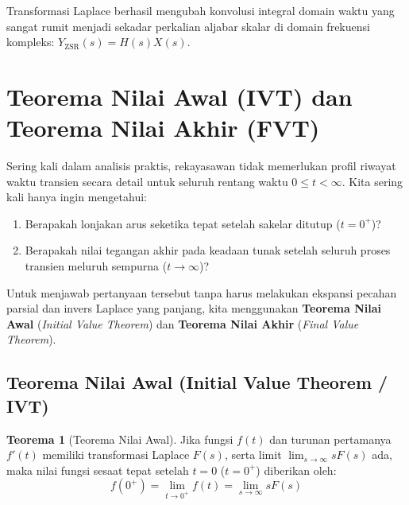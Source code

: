 \documentclass[11pt,a4paper]{article}
\theoremstyle{definition}
\newtheorem{theorem}{Teorema}[section]
\begin{document}
Transformasi Laplace berhasil mengubah konvolusi integral domain waktu yang sangat rumit menjadi sekadar perkalian aljabar skalar di domain frekuensi kompleks: $Y_{\text{ZSR}}(s) = H(s) X(s)$.

\section{Teorema Nilai Awal (IVT) dan Teorema Nilai Akhir (FVT)}

Sering kali dalam analisis praktis, rekayasawan tidak memerlukan profil riwayat waktu transien secara detail untuk seluruh rentang waktu $0 \le t < \infty$. Kita sering kali hanya ingin mengetahui:
\begin{enumerate}[leftmargin=*]
    \item Berapakah lonjakan arus seketika tepat setelah sakelar ditutup ($t = 0^+$)?
    \item Berapakah nilai tegangan akhir pada keadaan tunak setelah seluruh proses transien meluruh sempurna ($t \to \infty$)?
\end{enumerate}
Untuk menjawab pertanyaan tersebut tanpa harus melakukan ekspansi pecahan parsial dan invers Laplace yang panjang, kita menggunakan \textbf{Teorema Nilai Awal} (\textit{Initial Value Theorem}) dan \textbf{Teorema Nilai Akhir} (\textit{Final Value Theorem}).

\subsection{Teorema Nilai Awal (Initial Value Theorem / IVT)}

\begin{theorem}[Teorema Nilai Awal]
Jika fungsi $f(t)$ dan turunan pertamanya $f'(t)$ memiliki transformasi Laplace $F(s)$, serta limit $\lim_{s \to \infty} s F(s)$ ada, maka nilai fungsi sesaat tepat setelah $t = 0$ ($t = 0^+$) diberikan oleh:
\begin{equation}
    f(0^+) = \lim_{t \to 0^+} f(t) = \lim_{s \to \infty} s F(s)
    \label{eq:ivt_theorem}
\end{equation}
\end{theorem}
\end{document}
